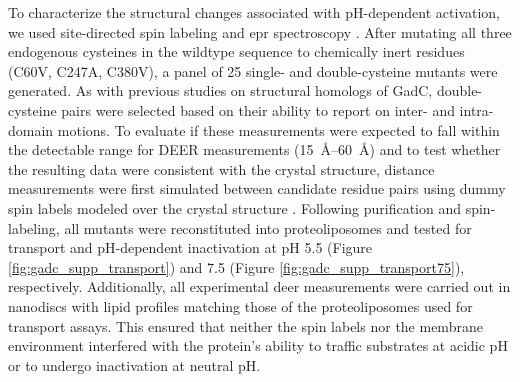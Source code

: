 To characterize the structural changes associated with pH-dependent activation, we used site-directed spin labeling and \gls{epr} spectroscopy \citep*{Jeschke2012, Mchaourab2011}. After mutating all three endogenous cysteines in the wildtype sequence to chemically inert residues (C60V, C247A, C380V), a panel of 25 single- and double-cysteine mutants were generated. As with previous studies on structural homologs of GadC, double-cysteine pairs were selected based on their ability to report on inter- and intra-domain motions. To evaluate if these measurements were expected to fall within the detectable range for DEER measurements (\SIrange{15}{60}{\angstrom}) and to test whether the resulting data were consistent with the crystal structure, distance measurements were first simulated between candidate residue pairs using dummy spin labels modeled over the crystal structure \citep*{Islam2013, Jo2014}. Following purification and spin-labeling, all mutants were reconstituted into proteoliposomes and tested for transport and pH-dependent inactivation at pH 5.5 (Figure \ref{fig:gadc_supp_transport}) and 7.5 (Figure \ref{fig:gadc_supp_transport75}), respectively. Additionally, all experimental \gls{deer} measurements were carried out in nanodiscs with lipid profiles matching those of the proteoliposomes used for transport assays. This ensured that neither the spin labels nor the membrane environment interfered with the protein's ability to traffic substrates at acidic pH or to undergo inactivation at neutral pH.



